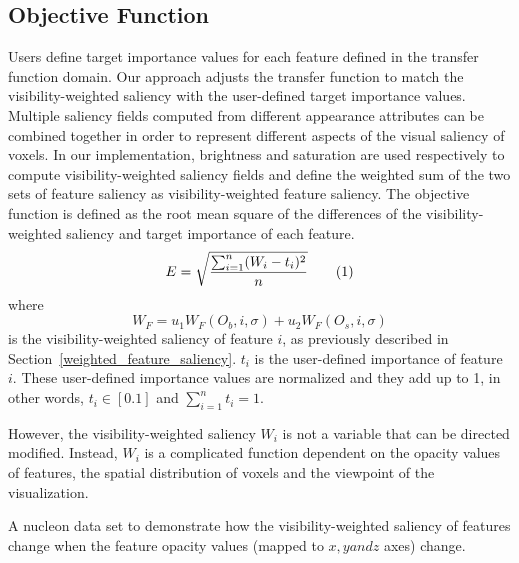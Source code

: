 \subsection{Objective Function}
Users define target importance values for each feature defined in the transfer function domain.
Our approach adjusts the transfer function to match the visibility-weighted saliency with the user-defined target importance values.
Multiple saliency fields computed from different appearance attributes can be combined together in order to represent different aspects of the visual saliency of voxels.
In our implementation, brightness and saturation are used respectively to compute visibility-weighted saliency fields and define the weighted sum of the two sets of feature saliency as visibility-weighted feature saliency.
The objective function is defined as the root mean square of the differences of the visibility-weighted saliency and target importance of each feature.
\[ E=\sqrt{ \frac{\sum_{i=1}^{n} (W_{i}-t_{i})^{2}}{n} } 
\addtag \]
where \[ W_{F}=u_{1}W_{F}(O_{b},i,\sigma)+u_{2}W_{F}(O_{s},i,\sigma) \] is the visibility-weighted saliency of feature $ i $, as previously described in Section~\ref{weighted_feature_saliency}. $ t_{i} $ is the user-defined importance of feature $ i $. These user-defined importance values are normalized and they add up to 1, in other words, $ t_{i} \in [0.1] $ and $ \sum_{i=1}^{n} t_{i} = 1 $.

However, the visibility-weighted saliency $ W_{i} $ is not a variable that can be directed modified. Instead, $ W_{i} $ is a complicated function dependent on the opacity values of features, the spatial distribution of voxels and the viewpoint of the visualization.

A nucleon data set \cite{website:Voreen_datasets_2013} to demonstrate how the visibility-weighted saliency of features change when the feature opacity values (mapped to $ x, y and z $ axes) change.


